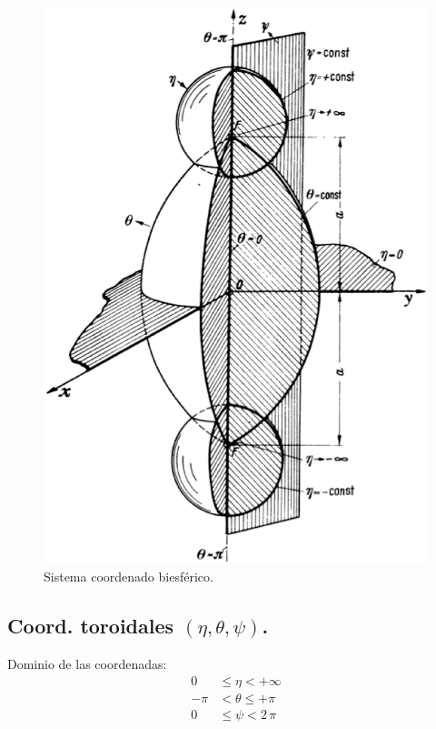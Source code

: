 \begin{figure}[H]
    \centering
    \includegraphics[scale=0.4]{Imagenes/Sistema_Biesferico.eps}
    \caption{Sistema coordenado biesférico.}
\end{figure}

\subsection{Coord. toroidales \texorpdfstring{$(\eta, \theta, \psi)$}{(e, t, p)}.}

Dominio de las coordenadas:
\begin{align*}
0 &\leq \eta < +\infty \\
-\pi &< \theta \leq +\pi \\
0 &\leq \psi < 2\, \pi
\end{align*}

